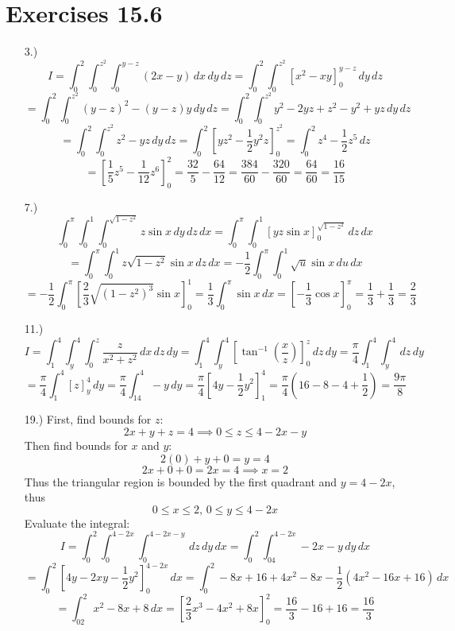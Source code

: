\documentclass[12pt]{article}
\newcommand{\bracks}[1]{\left[#1\right]}
\newcommand{\parns}[1]{\left(#1\right)}
\begin{document}
\pagestyle{fancy}
\fancyhead{}

\normalsize
\section*{Exercises 15.6}
\begin{itemize}
    \item [3.)] \[I=\int^2_0\int^{z^2}_0\int^{y-z}_0(2x-y)\,dx\,dy\,dz=\int^2_0\int^{z^2}_0\bracks{x^2-xy}^{y-z}_0\,dy\,dz\]
    \[=\int^2_0\int^{z^2}_0(y-z)^2-(y-z)y\,dy\,dz=\int^2_0\int^{z^2}_0y^2-2yz+z^2-y^2+yz\,dy\,dz\]
    \[=\int^2_0\int^{z^2}_0z^2-yz\,dy\,dz=\int^2_0\bracks{yz^2-\frac{1}{2}y^2z}^{z^2}_0=\int^2_0z^4-\frac{1}{2}z^5\,dz\]
    \[=\bracks{\frac{1}{5}z^5-\frac{1}{12}z^6}^2_0=\frac{32}{5}-\frac{64}{12}=\frac{384}{60}-\frac{320}{60}=\frac{64}{60}=\frac{16}{15}\]

    \item [7.)] \[\int^\pi_0\int^1_0\int^{\sqrt{1-z^2}}_0z\sin x\,dy\,dz\,dx=\int^\pi_0\int^1_0\bracks{yz\sin x}^{\sqrt{1-z^2}}_0\,dz\,dx\]
    \[=\int^\pi_0\int^1_0z\sqrt{1-z^2}\sin x\,dz\,dx=-\frac{1}{2}\int^\pi_0\int^1_0\sqrt u\sin x\,du\,dx\]
    \[=-\frac{1}{2}\int^\pi_0\bracks{\frac{2}{3}\sqrt{(1-z^2)^3}\sin x}^1_0=\frac{1}{3}\int^\pi_0\sin x\,dx=\bracks{-\frac{1}{3}\cos x}^\pi_0=\frac{1}{3}+\frac{1}{3}=\frac{2}{3}\]

    \item [11.)] \[I=\int^4_1\int^4_y\int^z_0\frac{z}{x^2+z^2}\,dx\,dz\,dy=\int^4_1\int^4_y\bracks{\tan^{-1}\parns{\frac{x}{z}}}^z_0\,dz\,dy=\frac{\pi}{4}\int^4_1\int^4_y\,dz\,dy\]
    \[=\frac\pi4\int^4_1\bracks{z}^4_y\,dy=\frac{\pi}{4}\int^4_14-y\,dy=\frac\pi4\bracks{4y-\frac{1}{2}y^2}^4_1=\frac\pi4\parns{16-8-4+\frac{1}{2}}=\frac{9\pi}{8}\]

    \item [19.)] First, find bounds for $z$:
    \[2x+y+z=4\implies0\leq z\leq 4-2x-y\]
    Then find bounds for $x$ and $y$:
    \[2(0)+y+0=y=4\]
    \[2x+0+0=2x=4\implies x=2\]
    Thus the triangular region is bounded by the first quadrant and $y=4-2x$, thus
    \[0\leq x\leq2,\,0\leq y\leq4-2x\]
    Evaluate the integral:
    \[I=\int^2_0\int^{4-2x}_0\int^{4-2x-y}_0\,dz\,dy\,dx=\int^2_0\int^{4-2x}_04-2x-y\,dy\,dx\]
    \[=\int^2_0\bracks{4y-2xy-\frac{1}{2}y^2}^{4-2x}_0\,dx=\int^2_0-8x+16+4x^2-8x-\frac{1}{2}(4x^2-16x+16)\,dx\]
    \[=\int^2_02x^2-8x+8\,dx=\bracks{\frac{2}{3}x^3-4x^2+8x}^2_0=\frac{16}{3}-16+16=\frac{16}{3}\]


\end{itemize}
\end{document}
